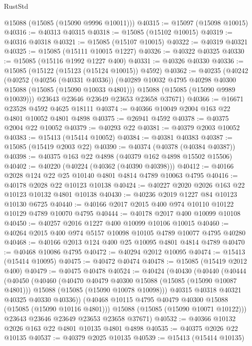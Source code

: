 \begin{lexlean}{RustStd}
\begin{coremodule}
      @15088
      (@15085 (@15090 @9996 @10011)))
@40315 := @15097 (@15098 @10015)
@40316 := @40313 @40315
@40318 := @15085 (@15102 @10015)
@40319 := @40316 @40318
@40321 := @15085 (@15107 @10015)
@40322 := @40319 @40321
@40325 := @15085 (@15111 @10015 @1227)
@40326 := @40322 @40325
@40330 := @15085 (@15116 @1992 @1227 @400)
@40331 := @40326 @40330
@40336 := @15085 (@15122 (@15123 (@15124 @10015)) @4592)
@40362 := @40235
    (@40242
      (@40252
        (@40256 (@40331 @40336))
        (@40289 @10032 @4795 @40298 @40300 @15088 (@15085 (@15090 @10033 @4801)))
        @15088
        (@15085 (@15090 @9989 @10039)))
      @23643
      @23646
      @23649
      @23653
      @23658
      @37671)
@40366 := @16671 @23528 @4592 @4625 @18111
@40374 := @40366 @10049 @2004 @163 @22 @4801 @10052 @4801 @4898
@40375 := @26941 @4592
@40378 := @40375 @2004 @22 @10052
@40379 := @40293 @22
@40381 := @40379 @2003 @10052
@40383 := @15413 (@15414 @10052)
@40384 := @40381 @40383
@40387 := @15085 (@15419 @2003 @22)
@40390 := @40374 (@40378 (@40384 @40387))
@40398 := @40375 @163 @22 @4898 (@40379 @162 @4898 @15502 @15506)
@40402 := @40220 (@40224 (@40362 (@40390 @40398)))
@40412 := @40166 @2028 @124 @22 @25 @10140 @4801 @4814 @4789 @10063 @4795
@40416 := @40178 @2028 @22 @10123 @10138
@40424 := @40227 @2020 @2026 @163 @22 @10123 @10132 @4801 @10138
@40430 := @40236 @2019 @1227 @84 @10123 @10130 @6725
@40440 := @40166 @2017 @2015 @400 @974 @10110 @10122 @10129 @4789 @10070 @4795
@40444 := @40178 @2017 @400 @10099 @10108
@40450 := @40257 @2016 @1227 @400 @10099 @10106 @10015
@40460 := @40264 @2015 @400 @974 @5157 @10098 @10105 @4789 @10077 @4795 @40280
@40468 := @40166 @2013 @124 @400 @25 @10095 @4801 @4814 @4789
@40470 := @40468 @10086 @4795
@40472 := @40294 @2012 @10095
@40474 := @15413 (@15414 @10095)
@40475 := @40472 @40474
@40478 := @15085 (@15419 @2012 @400)
@40479 := @40475 @40478
@40524 := @40424
    (@40430
      (@40440
        (@40444
          (@40450
            (@40460
              (@40470 @40479 @40300 @15088 (@15085 (@15090 @10087 @4801)))
              @15088
              (@15085 (@15090 @10078 @10098)))
            @40315
            @40318
            @40321
            @40325
            @40330
            @40336))
        (@40468 @10115 @4795 @40479 @40300 @15088 (@15085 (@15090 @10116 @4801)))
        @15088
        (@15085 (@15090 @10071 @10122)))
      @23643
      @23646
      @23649
      @23653
      @23658
      @37671)
@40532 := @40366 @10132 @2026 @163 @22 @4801 @10135 @4801 @4898
@40535 := @40375 @2026 @22 @10135
@40537 := @40379 @2025 @10135
@40539 := @15413 (@15414 @10135)

\end{coremodule}
\end{lexlean}
